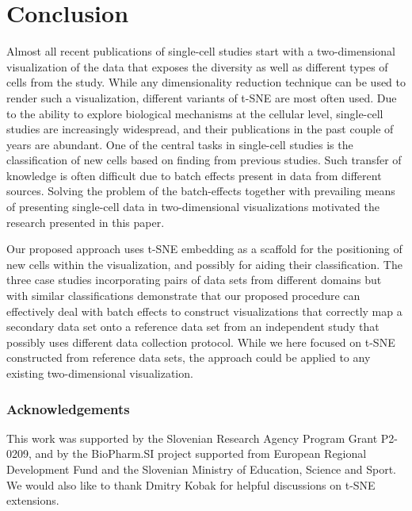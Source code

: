 \documentclass[runningheads]{llncs}
\begin{document}
\section{Conclusion}

Almost all recent publications of single-cell studies start with a
two-dimensional visualization of the data that exposes the diversity as well as
different types of cells from the study. While any dimensionality reduction
technique can be used to render such a visualization, different variants of
t-SNE are most often used. Due to the ability to explore biological mechanisms
at the cellular level, single-cell studies are increasingly widespread, and
their publications in the past couple of years are abundant. One of the central
tasks in single-cell studies is the classification of new cells based on
finding from previous studies. Such transfer of knowledge is often difficult
due to batch effects present in data from different sources. Solving the
problem of the batch-effects together with prevailing means of presenting
single-cell data in two-dimensional visualizations motivated the research
presented in this paper. 

Our proposed approach uses t-SNE embedding as a scaffold for the positioning of
new cells within the visualization, and possibly for aiding their
classification. The three case studies incorporating pairs of data sets from
different domains but with similar classifications demonstrate that our
proposed procedure can effectively deal with batch effects to construct
visualizations that correctly map a secondary data set onto a reference data
set from an independent study that possibly uses different data collection
protocol. While we here focused on t-SNE constructed from reference data sets,
the approach could be applied to any existing two-dimensional visualization.

\subsubsection*{Acknowledgements}

This work was supported by the Slovenian Research Agency Program Grant P2-0209,
and by the BioPharm.SI project supported from European Regional Development
Fund and the Slovenian Ministry of Education, Science and Sport. We would also
like to thank Dmitry Kobak for helpful discussions on t-SNE extensions.



\end{document}
